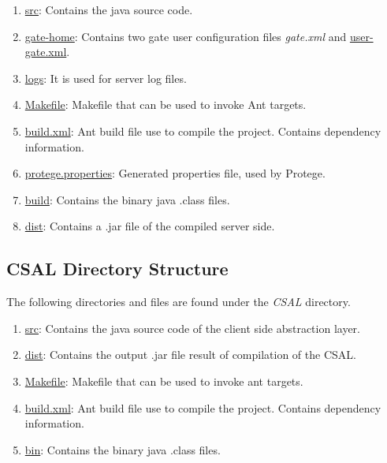 \begin{enumerate}
\item \url{src}: Contains the java source code.
\item \url{gate-home}: Contains two gate user configuration files \emph{gate.xml} and \url{user-gate.xml}.
\item \url{logs}: It is used for server log files.
\item \url{Makefile}: Makefile that can be used to invoke Ant targets.
\item \url{build.xml}: Ant build file use to compile the project. Contains dependency information.
\item \url{protege.properties}: Generated properties file, used by Protege.
\item \url{build}: Contains the binary java .class files.
\item \url{dist}: Contains a .jar file of the compiled server side.
\end{enumerate}


\subsection{CSAL Directory Structure}
The following directories and files are found under the \emph{CSAL} directory.

\begin{enumerate}
\item \url{src}: Contains the java source code of the client side abstraction layer.
\item \url{dist}: Contains the output .jar file result of compilation of the CSAL.
\item \url{Makefile}: Makefile that can be used to invoke ant targets.
\item \url{build.xml}: Ant build file use to compile the project. Contains dependency information.
\item \url{bin}: Contains the binary java .class files.
\end{enumerate}



